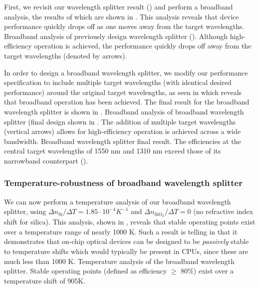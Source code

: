 First, we revisit our wavelength splitter result ()
    and perform a broadband analysis, 
    the results of which are shown in .
This analysis reveals that device performance quickly drops off
    as one moves away from the target wavelengths.
    {Broadband analysis of previously design wavelength splitter ().
    Although high-efficiency operation is achieved, 
    the performance quickly drops off away from the target wavelengths 
    (denoted by arrows).}

In order to design a broadband wavelength splitter,
    we modify our performance specification to include multiple target 
    wavelengths (with identical desired performance) around the 
    original target wavelengths, as seen in 
    which reveals that broadband operation has been achieved.
The final result for the broadband wavelength splitter is shown in .
    {Broadband analysis of broadband wavelength splitter 
        (final design shown in .
    The addition of multiple target wavelengths (vertical arrows)
    allows for 
    high-efficiency operation is achieved across a wide bandwidth.}
    {Broadband wavelength splitter final result.
    The efficiencies at the central target wavelengths of 1550 nm and 1310 nm
    exceed those of its narrowband counterpart ().}

\subsubsection{Temperature-robustness of broadband wavelength splitter}
We can now perform a temperature analysis of our broadband wavelength splitter,
    using $\Delta n_\text{Si} / \Delta T = 1.85 \cdot 10^{-4} K^{-1}$ 
    and $\Delta n_{\text{SiO}_2} / \Delta T = 0$ 
    (no refractive index shift for silica).
This analysis, shown in ,
    reveals that stable operating points exist
    over a temperature range of nearly 1000 K.
Such a result is telling in that it demonstrates
    that on-chip optical devices can be designed to be \emph{passively} stable
    to temperature shifts which would typically be present in CPUs,
    since these are much less than 1000 K.
    {Temperature analysis of the broadband wavelength splitter.
    Stable operating points (defined as efficiency $\ge$ 80\%)
    exist over a temperature shift of 905K.}

